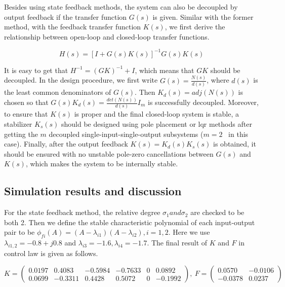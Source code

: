 \documentclass[hyperref]{article}
\theoremstyle{nonumberplain}
\begin{document}
	\hspace{1.0em}
	Besides using state feedback methods, the system can also be decoupled by output feedback if the transfer function $G(s)$ is given. Similar with the former method, with the feedback transfer function $K(s)$, we first derive the relationship between open-loop and closed-loop transfer functions.
	
	\begin{equation}
		H(s)=[I+G(s)K(s)]^{-1}G(s)K(s)
		\label{eq41}
	\end{equation}
	
	It is easy to get that $H^{-1}=(GK)^{-1}+I$, which means that $GK$ should be decoupled. In the design procedure, we first write $G(s)=\frac{N(s)}{d(s)}$, where $d(s)$ is the least common denominators of $G(s)$. Then $K_{d}(s)=adj(N(s))$ is chosen so that $G(s)K_{d}(s)=\frac{det(N(s))}{d(s)}I_{m}$ is successfully decoupled. Moreover, to ensure that $K(s)$ is proper and the final closed-loop system is stable, a stabilizer $K_{s}(s)$ should be designed using pole placement or lqr methods after getting the $m$ decoupled single-input-single-output subsystems ($m=2$ \ in this case). Finally, after the output feedback $K(s)=K_{d}(s)K_s(s)$ is obtained, it should be ensured with no unstable pole-zero cancellations between $G(s)$ and $K(s)$, which makes the system to be internally stable.
	
	
	\subsection{Simulation results and discussion}
	
	\hspace{1.0em}
	For the state feedback method, the relative degree $\sigma_{1} and \sigma_{2}$ are checked to be both 2. Then we define the stable characteristic polynomial of each input-output pair to be $\phi _{fi}(A)=(A-\lambda_{i1})(A-\lambda_{i2}), i=1,2$. Here we use $\lambda_{i 1,2}=-0.8+j0.8$ and $\lambda_{i 3}=-1.6,\lambda_{i 4}=-1.7$. The final result of $K$ and $F$ in control law is given as follows.
	
	\begin{equation}
	K=\begin{pmatrix}
	0.0197 &0.4083  &-0.5984  &-0.7633  &0  &0.0892 \\ 
	0.0699 &-0.3311  &0.4428  &0.5072  &0  &-0.1992 
	\end{pmatrix}, \ 
	F=\begin{pmatrix}
	0.0570 &-0.0106 \\ 
	-0.0378 &0.0237 
	\end{pmatrix}
	\nonumber
	\end{equation}
	
\end{document}
